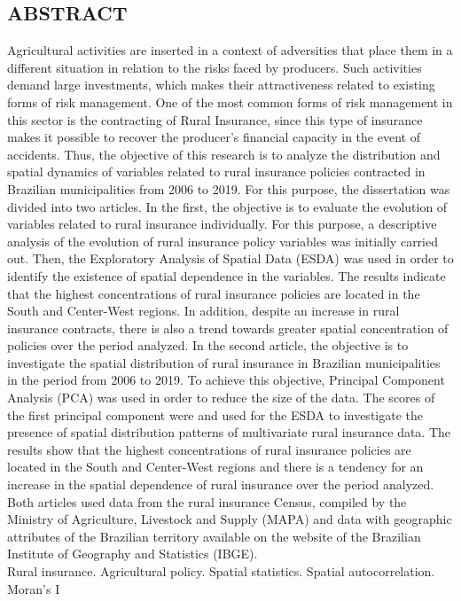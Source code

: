 
\newpage
\begin{singlespace}
\begin{center}
\section*{ABSTRACT}
\end{center}
Agricultural activities are inserted in a context of adversities that place them in a different situation in relation to the risks faced by producers. Such activities demand large investments, which makes their attractiveness related to existing forms of risk management. One of the most common forms of risk management in this sector is the contracting of Rural Insurance, since this type of insurance makes it possible to recover the producer's financial capacity in the event of accidents. Thus, the objective of this research is to analyze the distribution and spatial dynamics of variables related to rural insurance policies contracted in Brazilian municipalities from 2006 to 2019. For this purpose, the dissertation was divided into two articles. In the first, the objective is to evaluate the evolution of variables related to rural insurance individually. For this purpose, a descriptive analysis of the evolution of rural insurance policy variables was initially carried out. Then, the Exploratory Analysis of Spatial Data (ESDA) was used in order to identify the existence of spatial dependence in the variables. The results indicate that the highest concentrations of rural insurance policies are located in the South and Center-West regions. In addition, despite an increase in rural insurance contracts, there is also a trend towards greater spatial concentration of policies over the period analyzed. In the second article, the objective is to investigate the spatial distribution of rural insurance in Brazilian municipalities in the period from 2006 to 2019. To achieve this objective, Principal Component Analysis (PCA) was used in order to reduce the size of the data. The scores of the first principal component were and used for the ESDA to investigate the presence of spatial distribution patterns of multivariate rural insurance data. The results show that the highest concentrations of rural insurance policies are located in the South and Center-West regions and there is a tendency for an increase in the spatial dependence of rural insurance over the period analyzed. Both articles used data from the rural insurance Census, compiled by the Ministry of Agriculture, Livestock and Supply (MAPA) and data with geographic attributes of the Brazilian territory available on the website of the Brazilian Institute of Geography and Statistics (IBGE).\\
\newline
{} Rural insurance. Agricultural policy. Spatial statistics. Spatial autocorrelation. Moran’s I

\end{singlespace}
